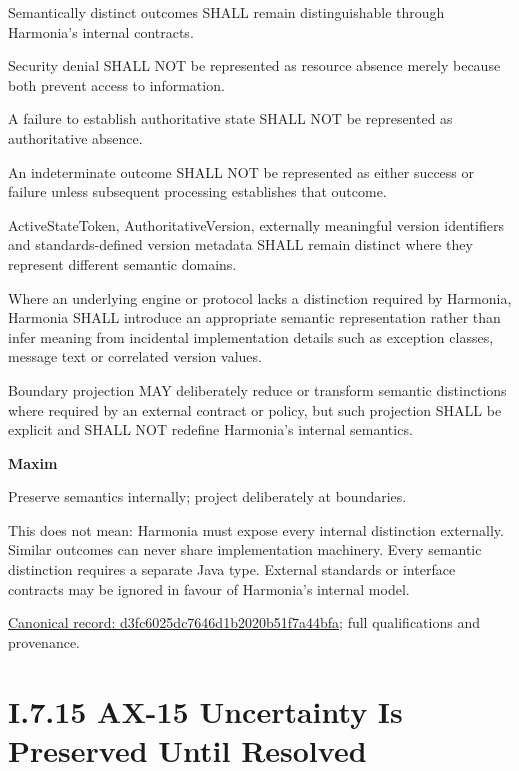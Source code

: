 Semantically distinct outcomes SHALL remain distinguishable through Harmonia's internal contracts.



Security denial SHALL NOT be represented as resource absence merely because both prevent access to information.



A failure to establish authoritative state SHALL NOT be represented as authoritative absence.



An indeterminate outcome SHALL NOT be represented as either success or failure unless subsequent processing establishes that outcome.



ActiveStateToken, AuthoritativeVersion, externally meaningful version identifiers and standards-defined version metadata SHALL remain distinct where they represent different semantic domains.



Where an underlying engine or protocol lacks a distinction required by Harmonia, Harmonia SHALL introduce an appropriate semantic representation rather than infer meaning from incidental implementation details such as exception classes, message text or correlated version values.



Boundary projection MAY deliberately reduce or transform semantic distinctions where required by an external contract or policy, but such projection SHALL be explicit and SHALL NOT redefine Harmonia's internal semantics.



\par\medskip\textbf{Maxim}\par


Preserve semantics internally; project deliberately at boundaries.



This does not mean: Harmonia must expose every internal distinction externally. Similar outcomes can never share implementation machinery. Every semantic distinction requires a separate Java type. External standards or interface contracts may be ignored in favour of Harmonia's internal model.


{\footnotesize \href{../../../../continuum/motivation/principle/d3fc6025dc7646d1b2020b51f7a44bfa.md}{Canonical record: d3fc6025dc7646d1b2020b51f7a44bfa}; full qualifications and provenance.}\par
\section*{I.7.15 AX-15 Uncertainty Is Preserved Until Resolved}
\label{navigation:I.7.15}

